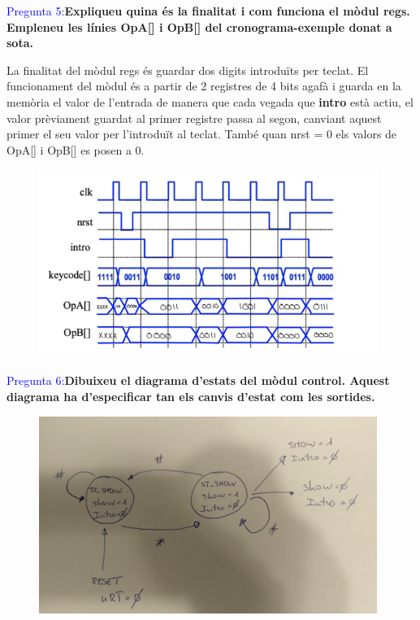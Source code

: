 \documentclass[12pt, a4papre]{article}
\begin{document}
	\textcolor{blue}{Pregunta 5:}\textbf{Expliqueu	quina	és	la	 finalitat	i	com	 funciona	el	mòdul	regs.	Empleneu les	línies	 OpA[] i	OpB[] del	cronograma-exemple	donat	a	sota.}
	
	La finalitat del mòdul regs és guardar dos digits introduïts per teclat. El funcionament del mòdul és a partir de 2 registres de 4 bits agafà i guarda en la memòria el valor de l'entrada de manera que cada vegada que  \textbf{intro} està actiu, el valor prèviament guardat al primer registre passa al segon, canviant aquest primer el seu valor per l’introduït al teclat.
	També quan nrst = 0 els valors de OpA[] i OpB[] es posen a 0.	
		\begin{figure}[H]
		\begin{center}
		\includegraphics[width=110mm]{pregunta5.jpeg}
		\end{center}
	\end{figure}
	
	\textcolor{blue}{Pregunta 6:}\textbf{Dibuixeu	el	diagrama	d’estats	del	mòdul control.	Aquest	diagrama	ha	d’especificar	tan	els	canvis	d’estat	com	les	sortides.	}
	\begin{figure}[H]
		\begin{center}
		\includegraphics[width=110mm]{pregunta6.jpeg}
		\end{center}
	\end{figure}
	
\end{document}
